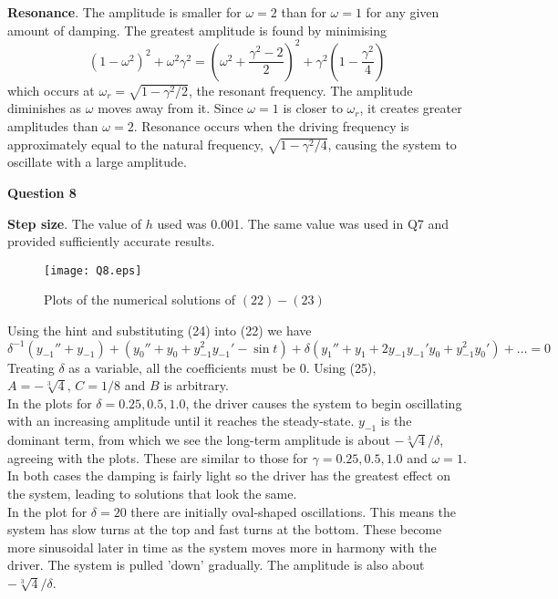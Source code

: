 \documentclass[14pt]{extarticle}
\begin{document}
\noindent \textbf{Resonance}. The amplitude is smaller for $\omega = 2$ than for $\omega = 1$ for any given amount of damping. The greatest amplitude is found by minimising
\[(1-\omega^2)^2+\omega^2\gamma^2 = \left(\omega^2 + \frac{\gamma^2 -2}{2}\right)^2+\gamma^2\left(1-\frac{\gamma^2}{4}\right)\]
which occurs at $\omega_r = \sqrt{1-\gamma^2/2}$, the resonant frequency. The amplitude diminishes as $\omega$ moves away from it. Since $\omega = 1$ is closer to $\omega_r$, it creates greater amplitudes than $\omega = 2$. Resonance occurs when the driving frequency is approximately equal to the natural frequency, $\sqrt{1-\gamma^2/4}$, causing the system to oscillate with a large amplitude.\\


\pagebreak
\begin{center}
\textbf{Question 8}
\end{center}
\noindent \textbf{Step size}. The value of $h$ used was 0.001. The same value was used in Q7 and provided sufficiently accurate results. 

\begin{figure}[htp!]
\centering
\texttt{[image: Q8.eps]}\\
\caption{Plots of the numerical solutions of $(22)-(23)$}
\label{figure:6}
\end{figure}

\noindent Using the hint and substituting (24) into (22) we have
\[\delta^{-1}(y_{-1}''+y_{-1})+(y_0''+y_0+y_{-1}^2y_{-1}'-\sin t)+\delta(y_1''+y_1+2y_{-1}y_{-1}'y_0+y_{-1}^2y_0')+\hdots = 0\]
Treating $\delta$ as a variable, all the coefficients must be 0. Using (25), $A = -\sqrt[3]{4},\, C = 1/8$ and $B$ is arbitrary.\\

\noindent In the plots for $\delta = 0.25,0.5,1.0$, the driver causes the system to begin oscillating with an increasing amplitude until it reaches the steady-state. $y_{-1}$ is the dominant term, from which we see the long-term amplitude is about $-\sqrt[3]{4}/\delta$, agreeing with the plots. These are similar to those for $\gamma = 0.25,0.5,1.0$ and $\omega = 1$. In both cases the damping is fairly light so the driver has the greatest effect on the system, leading to solutions that look the same.  \\

\noindent In the plot for $\delta = 20$ there are initially oval-shaped oscillations. This means the system has slow turns at the top and fast turns at the bottom. These become more sinusoidal later in time as the system moves more in harmony with the driver. The system is pulled 'down' gradually. The amplitude is also about $-\sqrt[3]{4}/\delta$.\\
\end{document}
